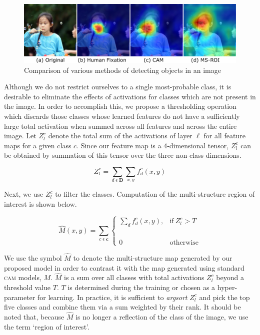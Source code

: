 \begin{figure}[H]
    \centering
    \includegraphics[scale=0.45]{figures/semantic/girl_compression.pdf}
    \caption[MSROI vs CAM vs Saliency]{Comparison of various methods of detecting objects in an image \label{fig_comparison_of_map}}
\end{figure}

Although we do not restrict ourselves to a single most-probable class, it is desirable to eliminate the effects of activations for classes which are not present in the image.  
In order to accomplish this, we propose a thresholding operation which discards those classes whose learned features do not have a sufficiently large total activation when summed across all features and across the entire image.  
Let $Z^c_l$ denote the total sum of the activations of layer $\ell$ for all feature maps for a given class $c$.
Since our feature map is a $4$-dimensional tensor, $Z^c_l$ can be obtained by summation of this tensor over the three non-class dimensions.

\begin{equation}
    Z^c_l = \sum_{d \; \epsilon \; \mathbf{D}} \sum_{x,y} f_d^c(x,y)
    \label{eqn_Zscore}
\end{equation}

Next, we use $Z^c_l$ to filter the classes. Computation of the multi-structure region of interest is shown below.

\begin{equation}
    \hat{M}(x,y) = \sum_{c \; \epsilon \; \mathbf{c} }
    \begin{cases}
        \sum_d f_d^c(x,y), & \text{if}\ Z^c_l > T \\
        \phantom{this_is_empty} \\
      0 & \text{otherwise}
    \end{cases}
    \label{eqn_msroi}
\end{equation}

We use the symbol $\hat{M}$ to denote the multi-structure map generated by our proposed model in order to contrast it with the map generated using standard \textsc{cam} models, $ M $.
$ \hat{M} $ is a sum over all classes with total activations $Z^c_l$ beyond a threshold value $T$.
$T$ is determined during the training or chosen as a hyper-parameter for learning. 
In practice, it is sufficient to \textit{argsort} $Z^c_l$ and pick the top five classes and combine them via a sum weighted by their rank. 
It should be noted that, because $ \hat{M} $ is no longer a reflection of the class of the image, we use the term `region of interest'.

